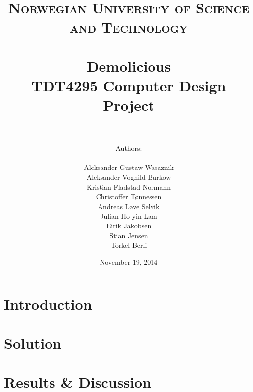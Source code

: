 \documentclass[paper=a4, fontsize=11pt]{report} %
\title{ 
\normalfont \normalsize 
\textsc{Norwegian University of Science and Technology} \\ [25pt] %
\horrule{0.5pt} \\[0.4cm] %
\huge \textbf{Demolicious} \\ %
TDT4295 Computer Design Project\\
\horrule{2pt} \\[0.5cm] %
}
\author{Authors:\\ \\
Aleksander Gustaw Wasaznik\\
Aleksander Vognild Burkow\\
Kristian Fladstad Normann\\
Christoffer Tønnessen\\
Andreas Løve Selvik\\
Julian Ho-yin Lam\\
Eirik Jakobsen\\
Stian Jensen\\
Torkel Berli}
\date{\normalsize November 19, 2014}
\begin{document}

\maketitle

\newpage



\thispagestyle{firststyle}

\newpage



\newpage

\tableofcontents

\setcounter{secnumdepth}{3}

\newpage


\part{Introduction}





\part{Solution}











\part{Results \& Discussion}











\printbibliography

\newpage

\appendix



\end{document}
